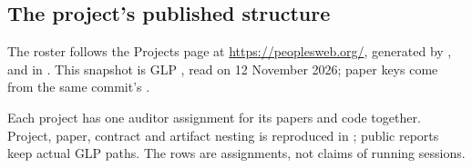 \subsection{The project's published structure}

The roster follows the Projects page at \url{https://peoplesweb.org/}, generated by ,  and  in . This snapshot is GLP , read on 12 November 2026; paper keys come from the same commit's .

Each project has one auditor assignment for its papers and code together. Project, paper, contract and artifact nesting is reproduced in ; public reports keep actual GLP paths. The rows are assignments, not claims of running sessions.

